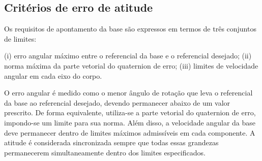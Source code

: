\subsection{Critérios de erro de atitude}
\label{sec:criterios_erro_atitude}

Os requisitos de apontamento da base são expressos em termos de três conjuntos de limites:

(i) erro angular máximo entre o referencial da base e o referencial desejado;
(ii) norma máxima da parte vetorial do quaternion de erro;
(iii) limites de velocidade angular em cada eixo do corpo.

O erro angular é medido como o menor ângulo de rotação que leva o referencial da base ao referencial desejado, devendo permanecer abaixo de um valor prescrito.
De forma equivalente, utiliza-se a parte vetorial do quaternion de erro, impondo-se um limite para sua norma.
Além disso, a velocidade angular da base deve permanecer dentro de limites máximos admissíveis em cada componente.
A atitude é considerada sincronizada sempre que todas essas grandezas permanecerem simultaneamente dentro dos limites especificados.
